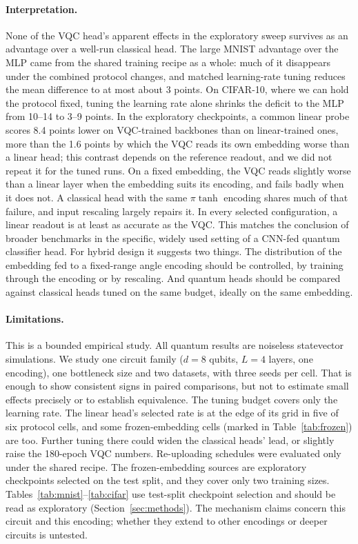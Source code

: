 \documentclass[10pt]{article}
\begin{document}
\paragraph{Interpretation.}
None of the VQC head's apparent effects in the exploratory sweep survives as an
advantage over a well-run classical head. The large MNIST advantage over the
MLP came from the shared training recipe as a whole: much of it disappears under
the combined protocol changes, and matched learning-rate tuning reduces the
mean difference to at most about 3 points. On CIFAR-10,
where we can hold the protocol fixed, tuning the learning rate alone shrinks the
deficit to the MLP from 10--14 to 3--9 points. In the exploratory checkpoints,
a common linear probe scores 8.4 points lower on VQC-trained backbones than on
linear-trained ones, more than the 1.6 points by which the VQC reads its own
embedding worse than a linear head; this contrast depends on the reference
readout, and we did not repeat it for the tuned runs. On a fixed embedding, the VQC
reads slightly worse than a linear layer when the embedding suits its encoding,
and fails badly when it does not. A classical head with the same $\pi\tanh$
encoding shares much of that failure, and input rescaling largely repairs it.
In every selected configuration, a linear readout is at least as accurate as
the VQC. This matches
the conclusion of broader benchmarks \citep{bowles2024better} in the specific,
widely used setting of a CNN-fed quantum classifier head. For hybrid design it
suggests two things. The distribution of the embedding fed to a fixed-range
angle encoding should be controlled, by training through the encoding or by
rescaling. And quantum heads should be compared against classical heads tuned
on the same budget, ideally on the same embedding.

\paragraph{Limitations.}
This is a bounded empirical study. All quantum results are noiseless
statevector simulations. We study one circuit family ($d=8$ qubits, $L=4$
layers, one encoding), one bottleneck size and two datasets, with three seeds
per cell. That is enough to show consistent signs in paired comparisons, but
not to estimate small effects precisely or to establish equivalence. The tuning
budget covers only the learning rate. The linear head's selected rate is at the
edge of its grid in five of six protocol cells, and some frozen-embedding cells
(marked in Table~\ref{tab:frozen}) are too. Further tuning there could widen
the classical heads' lead, or slightly raise the 180-epoch VQC numbers. Re-uploading schedules were evaluated only
under the shared recipe. The frozen-embedding sources are exploratory
checkpoints selected on the test split, and they cover only two training sizes.
Tables~\ref{tab:mnist}--\ref{tab:cifar} use test-split checkpoint selection and
should be read as exploratory (Section~\ref{sec:methods}). The mechanism claims
concern this circuit and this encoding; whether they extend to other encodings
or deeper circuits is untested.
\end{document}
